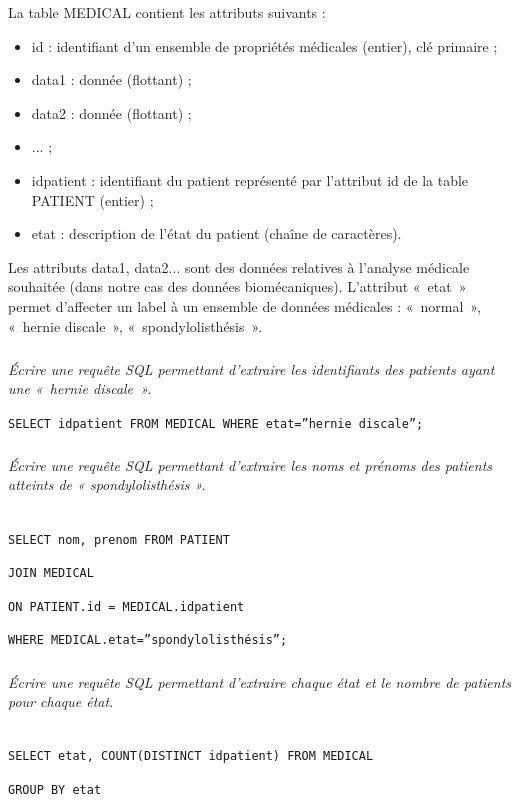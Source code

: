 La table MEDICAL contient les attributs suivants :
\begin{itemize}
\item id : identifiant d’un ensemble de propriétés médicales (entier), clé primaire ;
\item data1 : donnée (flottant) ;
\item data2 : donnée (flottant) ;
\item ... ;
\item idpatient : identifiant du patient représenté par l’attribut id de la table PATIENT (entier) ;
\item etat : description de l’état du patient (chaîne de caractères).
\end{itemize}

Les attributs data1, data2... sont des données relatives à l’analyse médicale souhaitée (dans notre cas
des données biomécaniques). L’attribut «~etat~» permet d’affecter un label à un ensemble de données
médicales : «~normal~», «~hernie discale~», «~spondylolisthésis~».
\fi

\subparagraph{}\textit{Écrire une requête SQL permettant d’extraire les identifiants des patients ayant une «~hernie
discale~».}

\ifprof
\begin{corrige}
\texttt{SELECT idpatient FROM MEDICAL WHERE etat=''hernie discale'';}
\end{corrige}
\else
\fi

\subparagraph{}\textit{Écrire une requête SQL permettant d’extraire les noms et prénoms des patients atteints de
« spondylolisthésis ».}
\ifprof
\begin{corrige} ~\\
\texttt{SELECT nom, prenom FROM PATIENT}

					\texttt{JOIN MEDICAL}
					
					\texttt{ON PATIENT.id = MEDICAL.idpatient}
					
					\texttt{WHERE MEDICAL.etat=''spondylolisthésis'';}
\end{corrige}
\else
\fi

\subparagraph{}\textit{Écrire une requête SQL permettant d’extraire chaque état et le nombre de patients pour chaque
état.}
\ifprof
\begin{corrige}
~\\
\texttt{SELECT etat, COUNT(DISTINCT idpatient) FROM MEDICAL}

					\texttt{GROUP BY etat}
					
\end{corrige}
\else
\fi

